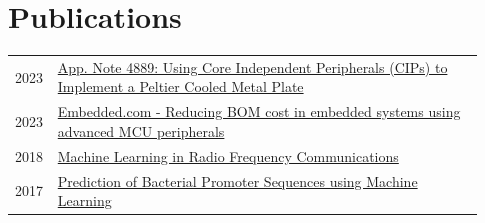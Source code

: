 \documentclass[
	10pt, %
]{FreemanCV}
\begin{document}
\section{Publications}


\begin{supertabular}{p{0.05\linewidth} p{0.88\linewidth}} %
	
	2023 & \href{
	https://ww1.microchip.com/downloads/aemDocuments/documents/MCU08/ApplicationNotes/ApplicationNotes/AN4889-Using-CIPs-To-Implement-Peltier-Plate-DS00004889.pdf
	}{
	App. Note 4889: Using Core Independent Peripherals (CIPs) to Implement a Peltier Cooled Metal Plate
	\linkcolor\scriptsize\faLink} \\
	2023 & \href{
	https://www.embedded.com/reducing-bom-cost-in-embedded-systems-using-advanced-mcu-peripherals/
	}{
	Embedded.com - Reducing BOM cost in embedded systems using advanced MCU peripherals
	\linkcolor\scriptsize\faLink} \\
	2018 & \href{
	https://drive.google.com/file/d/1ahMgJkOzDFT0BEsHZc04HTOVYgTw2Jwk/view?usp=sharing
	}{
	Machine Learning in Radio Frequency Communications
	\linkcolor\scriptsize\faLink} \\
	2017 & \href{
	https://drive.google.com/file/d/1DlJoP0vrhcTAQ2xS4j6Xr0FjgohUjOQ_/view?usp=sharing
	}{
	Prediction of Bacterial Promoter Sequences using Machine Learning
	\linkcolor\scriptsize\faLink} \\
	
\end{supertabular}

\medskip %

\end{document}
